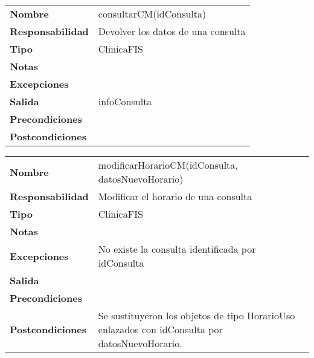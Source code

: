 \begin{table}[htbp]
	  \begin{tabularx}{\textwidth}{l|l}
    \textbf{Nombre}        &  consultarCM(idConsulta) \\ 
    \textbf{Responsabilidad}  & Devolver los datos de una consulta \\ 
    \textbf{Tipo}        &  ClinicaFIS\\ 
    \textbf{Notas}        & \\ 
    \textbf{Excepciones}    &  \\ 
    \textbf{Salida}        & infoConsulta \\ 
    \textbf{Precondiciones}    &  \\ 
    \textbf{Postcondiciones}  &  \\ 
  \end{tabularx}

\end{table}


\begin{table}[htbp]
	  \begin{tabularx}{\textwidth}{l|l}
    \textbf{Nombre}        & modificarHorarioCM(idConsulta, datosNuevoHorario) \\ 
    \textbf{Responsabilidad}  & Modificar el horario de una consulta \\ 
    \textbf{Tipo}        & ClinicaFIS \\ 
    \textbf{Notas}        &  \\ 
    \textbf{Excepciones}    & No existe la consulta identificada por idConsulta \\ 
    \textbf{Salida}        &  \\ 
    \textbf{Precondiciones}    &  \\ 
    \textbf{Postcondiciones}  &  Se sustituyeron los objetos de tipo HorarioUso enlazados con idConsulta por datosNuevoHorario. \\ 
  \end{tabularx}

\end{table}





